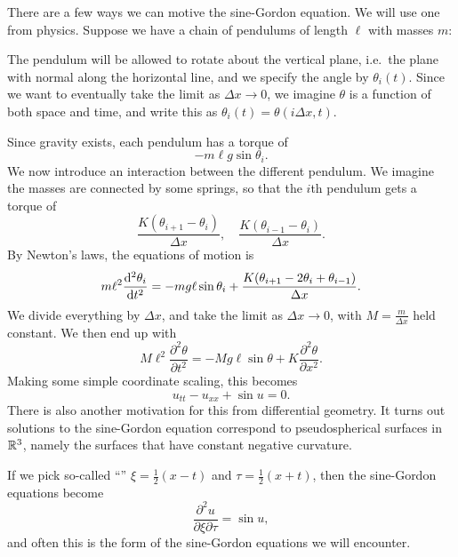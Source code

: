 \documentclass[a4paper]{article}
\begin{document}
There are a few ways we can motive the sine-Gordon equation. We will use one from physics. Suppose we have a chain of pendulums of length $\ell$ with masses $m$:
\begin{center}
\end{center}
The pendulum will be allowed to rotate about the vertical plane, i.e.\ the plane with normal along the horizontal line, and we specify the angle by $\theta_i(t)$. Since we want to eventually take the limit as $\Delta x \to 0$, we imagine $\theta$ is a function of both space and time, and write this as $\theta_i(t) = \theta(i \Delta x, t)$.

Since gravity exists, each pendulum has a torque of
\[
  -m\ell g \sin \theta_i.
\]
We now introduce an interaction between the different pendulum. We imagine the masses are connected by some springs, so that the $i$th pendulum gets a torque of
\[
  \frac{K(\theta_{i + 1} - \theta_i)}{\Delta x},\quad \frac{K(\theta_{i - 1} - \theta_i)}{\Delta x}.
\]
By Newton's laws, the equations of motion is
\[
  m\ell^2 \frac{\mathrm{d}^2 \theta_i}{\mathrm{d} t^2} = -mg \ell \sin \theta_i + \frac{K(\theta_{i + 1} - 2 \theta_i + \theta_{i - 1})}{\Delta x}.
\]
We divide everything by $\Delta x$, and take the limit as $\Delta x \to 0$, with $M = \frac{m}{\Delta x}$ held constant. We then end up with
\[
  M \ell^2 \frac{\partial^2 \theta}{\partial t^2} = - Mg\ell \sin \theta + K \frac{\partial^2 \theta}{\partial x^2}.
\]
Making some simple coordinate scaling, this becomes
\[
  u_{tt} - u_{xx} + \sin u = 0.
\]
There is also another motivation for this from differential geometry. It turns out solutions to the sine-Gordon equation correspond to pseudospherical surfaces in $\mathbb{R}^3$, namely the surfaces that have constant negative curvature.

If we pick so-called ``'' $\xi = \frac{1}{2}(x - t)$ and $\tau = \frac{1}{2}(x + t)$, then the sine-Gordon equations become
\[
  \frac{\partial^2 u}{\partial \xi \partial\tau} = \sin u,
\]
and often this is the form of the sine-Gordon equations we will encounter.
\end{document}

